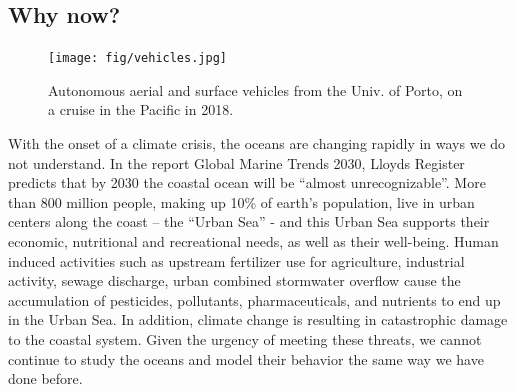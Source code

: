 \subsection{Why now?}

\begin{figure}[!t]
  \centering
  \texttt{[image: fig/vehicles.jpg]}
  \caption{Autonomous aerial and surface vehicles from the Univ. of
    Porto, on a cruise in the Pacific in 2018.}
\label{fig:vehicles}
\end{figure}

With the onset of a climate crisis, the oceans are changing rapidly in
ways we do not understand.  In the report Global Marine Trends 2030,
Lloyds Register predicts that by 2030 the coastal ocean will be
“almost unrecognizable”. More than 800 million people, making up 10\%
of earth’s population, live in urban centers along the coast – the
“Urban Sea” - and this Urban Sea supports their economic, nutritional
and recreational needs, as well as their well-being. Human induced
activities such as upstream fertilizer use for agriculture, industrial
activity, sewage discharge, urban combined stormwater overflow cause
the accumulation of pesticides, pollutants, pharmaceuticals, and
nutrients to end up in the Urban Sea.  In addition, climate change is
resulting in catastrophic damage to the coastal system.  Given the
urgency of meeting these threats, we cannot continue to study the
oceans and model their behavior the same way we have done before.




